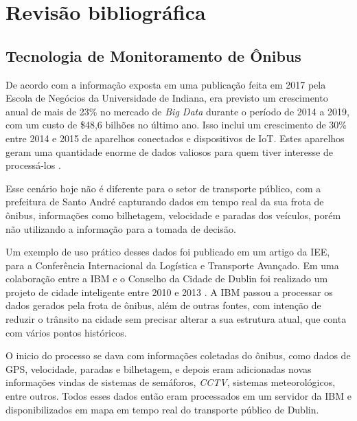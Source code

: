 \chapter{Revisão bibliográfica}
\label{Cap:RevisaoBibliografica}
\newcommand{\WidthAlgumaCoisa}{6.5 cm}



\section{Tecnologia de Monitoramento de Ônibus}

\indent
\par De acordo com a informação exposta em uma publicação feita em 2017 pela Escola de Negócios da Universidade de Indiana, era previsto um crescimento anual de mais de 23\% no mercado de \textit{Big Data} durante o período de 2014 a 2019, com um custo de \$48,6 bilhões no último ano. Isso inclui um crescimento de 30\% entre 2014 e 2015 de aparelhos conectados e dispositivos de IoT. Estes aparelhos geram uma quantidade enorme de dados valiosos para quem tiver interesse de processá-los \cite{Lee2017}.

\par Esse cenário hoje não é diferente para o setor de transporte público, com a prefeitura de Santo André capturando dados em tempo real da sua frota de ônibus, informações como bilhetagem, velocidade e paradas dos veículos, porém não utilizando a informação para a tomada de decisão.

\par Um exemplo de uso prático desses dados foi publicado em um artigo da IEE, para a Conferência Internacional da Logística e Transporte Avançado. Em uma colaboração entre a IBM e o Conselho da Cidade de Dublin foi realizado um projeto de cidade inteligente entre 2010 e 2013 \cite{BenAyed2015}. A IBM passou a processar os dados gerados pela frota de ônibus, além de outras fontes, com intenção de reduzir o trânsito na cidade sem precisar alterar a sua estrutura atual, que conta com vários pontos históricos.

\par O inicio do processo se dava com informações coletadas do ônibus, como dados de GPS, velocidade, paradas e bilhetagem, e depois eram adicionadas novas informações vindas de sistemas de semáforos, \textit{CCTV}, sistemas meteorológicos, entre outros. Todos esses dados então eram processados em um servidor da IBM e disponibilizados em mapa em tempo real do transporte público de Dublin.

